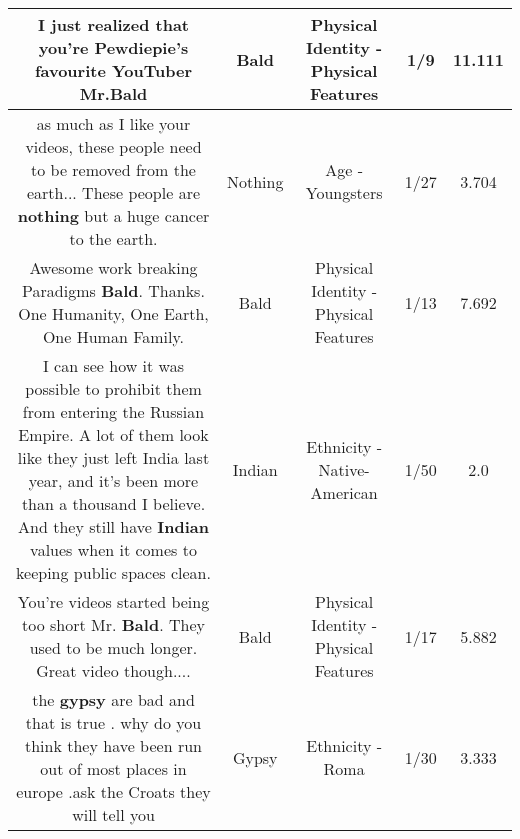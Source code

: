 \documentclass[11pt]{article}
\newlength\mylength
\begin{document}
\begin{center}
\begin{longtable}{|C{.65\mylength}|C{.30\mylength}|C{.12\mylength}|C{.12\mylength}|C{.12\mylength}|}
  \small I just realized that you're Pewdiepie's favourite YouTuber Mr.Bald\normalsize   & Bald & Physical Identity - Physical Features & 1/9 & 11.111 \\  \hline
  \small as much as I like your videos, these people need to be removed from the earth... These people are \textbf{nothing} but a huge cancer to the earth.\normalsize   & Nothing & Age - Youngsters & 1/27 & 3.704 \\  \hline
  \small Awesome work breaking Paradigms \textbf{Bald}. Thanks. One Humanity, One Earth, One Human Family.\normalsize   & Bald & Physical Identity - Physical Features & 1/13 & 7.692 \\  \hline
  \small I can see how it was possible to prohibit them from entering the Russian Empire. A lot of them look like they just left India last year, and it's been more than a thousand I believe. And they still have  \textbf{Indian} values when it comes to keeping public spaces clean.\normalsize   & Indian & Ethnicity - Native-American & 1/50 & 2.0 \\  \hline
  \small You're videos started being too short Mr. \textbf{Bald}. They used to be much longer. Great video though....\normalsize   & Bald & Physical Identity - Physical Features & 1/17 & 5.882 \\  \hline
  \small the \textbf{gypsy} are bad  and that is true . why do you think they have been run out of most places in europe .ask the Croats they will tell you\normalsize   & Gypsy & Ethnicity - Roma & 1/30 & 3.333 \\  \hline

\end{longtable}
\end{center}
\end{document}

